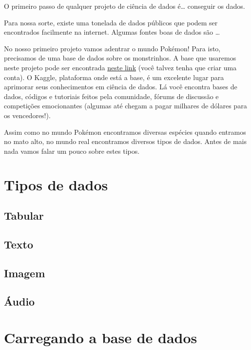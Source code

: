 \documentclass[]{book}
\begin{document}
O primeiro passo de qualquer projeto de ciência de dados é\ldots{} conseguir os dados.

Para nossa sorte, existe uma tonelada de dados públicos que podem ser encontrados facilmente na internet. Algumas fontes boas de dados são \ldots{}

No nosso primeiro projeto vamos adentrar o mundo Pokémon! Para isto, precisamos de uma base de dados sobre os monstrinhos. A base que usaremos neste projeto pode ser encontrada \href{https://www.kaggle.com/rounakbanik/pokemon/data}{neste link} (você talvez tenha que criar uma conta). O Kaggle, plataforma onde está a base, é um excelente lugar para aprimorar seus conhecimentos em ciência de dados. Lá você encontra bases de dados, códigos e tutoriais feitos pela comunidade, fórums de discussão e competições emocionantes (algumas até chegam a pagar milhares de dólares para os vencedores!).

Assim como no mundo Pokémon encontramos diversas espécies quando entramos no mato alto, no mundo real encontramos diversos tipos de dados. Antes de mais nada vamos falar um pouco sobre estes tipos.

\hypertarget{tipos-de-dados}{%
\section{Tipos de dados}\label{tipos-de-dados}}

\hypertarget{tabular}{%
\subsection{Tabular}\label{tabular}}

\hypertarget{texto}{%
\subsection{Texto}\label{texto}}

\hypertarget{imagem}{%
\subsection{Imagem}\label{imagem}}

\hypertarget{uxe1udio}{%
\subsection{Áudio}\label{uxe1udio}}

\hypertarget{carregando-a-base-de-dados}{%
\section{Carregando a base de dados}\label{carregando-a-base-de-dados}}
\end{document}

